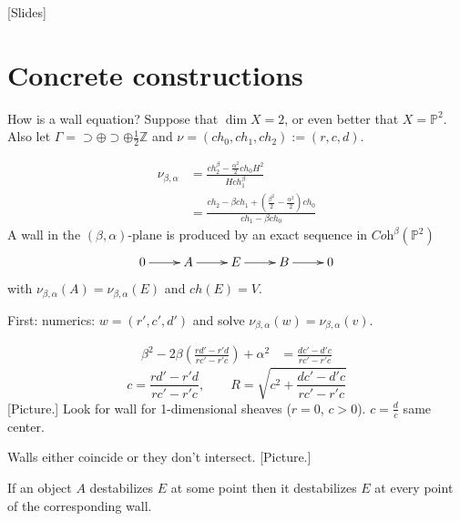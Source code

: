 [Slides]

\section{Concrete constructions}
\label{section-concrete-constructions}

How is a wall equation? Suppose that $\dim
X=2$, or even better that $X=
\mathbb{P}^2$. Also let
$\Gamma=\supset \oplus \supset \oplus
\frac{1}{2}\mathbb{Z}$ and
$\nu=(ch_0,ch_1,ch_2):=(r,c,d)$.

$$
\begin{aligned}
\nu_{\beta,\alpha}&
=\frac{ch_2^\beta-\frac{\alpha^2}{2}ch_0H^2}
{H
ch_1^\beta}\\
&=\frac{ch_2-\beta
ch_1+\left(\frac{\beta^2}{2}-
\frac{\alpha^2}{2}\right)ch_0}{ch_1-\beta
ch_0}
\end{aligned}
$$
A wall in the $(\beta,\alpha)$-plane is
produced by an exact sequence in
$\textit{Coh}^\beta(\mathbb{P}^2)$
$$
\xymatrix{
0\ar[r]&A\ar[r]&E\ar[r]&B\ar[r]&0
}
$$
with
$\nu_{\beta,\alpha}(A)=\nu_{\beta,\alpha}(E)$
and $ch(E)=V$.

\medskip\noindent
First: numerics: $w=(r',c',d')$ and solve
$\nu_{\beta,\alpha}(w)=\nu_{\beta,\alpha}(v)
$.

$$
\begin{aligned}
\beta^2-2\beta\left(\frac{rd'-r'd}{rc'-r'c}
\right)+\alpha^2&=
\frac{d c'-d'c}{rc'-r'c}
\end{aligned}
$$
$$
c=\frac{rd'-r'd}{rc'-r'c},\qquad
R=\sqrt{c^2+\frac{d c'-d'c}{rc'-r'c}}
$$
[Picture.] Look for wall for 1-dimensional
sheaves ($r=0$, $c>0$). $c=\frac{d}{c}$ same
center.

\begin{remark}
\label{bsgt-label-005}
Walls either coincide or they don't
intersect. [Picture.]
\end{remark}

\begin{lemma}
\label{lemma-Bertan}
If an object $A$ destabilizes $E$ at some
point then it destabilizes $E$ at every point
of the corresponding wall.
\end{lemma}

